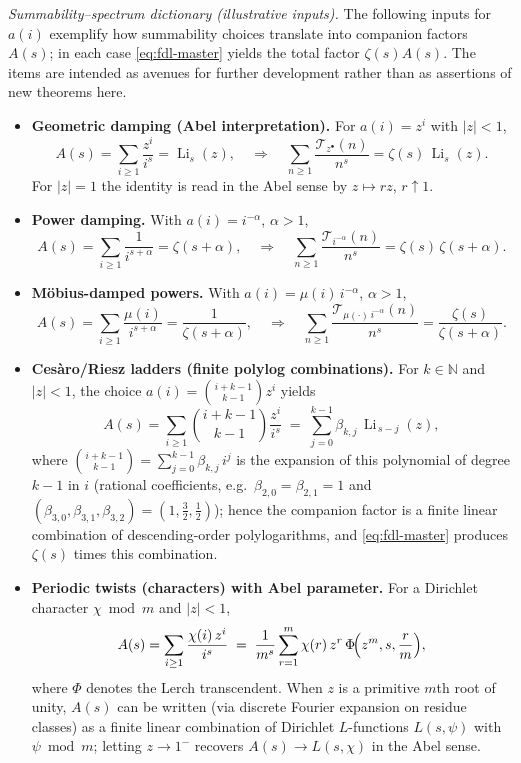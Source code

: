 \medskip
\noindent\emph{Summability--spectrum dictionary (illustrative inputs).}
The following inputs for $a(i)$ exemplify how summability choices translate into companion factors $A(s)$; in each case \eqref{eq:fdl-master} yields the total factor $\zeta(s)A(s)$. The items are intended as avenues for further development rather than as assertions of new theorems here.

\begin{itemize}
  \item[\textbf{(G)}] \textbf{Geometric damping (Abel interpretation).} For $a(i)=z^i$ with $|z|<1$,
  \[
  A(s)=\sum_{i\ge1}\frac{z^i}{i^s}=\operatorname{Li}_s(z),
  \quad\Rightarrow\quad
  \sum_{n\ge1}\frac{\mathcal T_{z^\bullet}(n)}{n^s}=\zeta(s)\,\operatorname{Li}_s(z).
  \]
  For $|z|=1$ the identity is read in the Abel sense by $z\mapsto rz$, $r\uparrow1$.
  \item[\textbf{(P)}] \textbf{Power damping.} With $a(i)=i^{-\alpha}$, $\alpha>1$,
  \[
  A(s)=\sum_{i\ge1}\frac{1}{i^{s+\alpha}}=\zeta(s+\alpha),
  \quad\Rightarrow\quad
  \sum_{n\ge1}\frac{\mathcal T_{i^{-\alpha}}(n)}{n^s}=\zeta(s)\,\zeta(s+\alpha).
  \]
  \item[\textbf{(M)}] \textbf{M\"obius-damped powers.} With $a(i)=\mu(i)\,i^{-\alpha}$, $\alpha>1$,
  \[
  A(s)=\sum_{i\ge1}\frac{\mu(i)}{i^{s+\alpha}}=\frac{1}{\zeta(s+\alpha)},
  \quad\Rightarrow\quad
  \sum_{n\ge1}\frac{\mathcal T_{\mu(\cdot)\,i^{-\alpha}}(n)}{n^s}=\frac{\zeta(s)}{\zeta(s+\alpha)}.
  \]
  \item[\textbf{(C)}] \textbf{Ces\`aro/Riesz ladders (finite polylog combinations).}
  For $k\in\mathbb N$ and $|z|<1$, the choice $a(i)=\binom{i+k-1}{k-1}z^i$ yields
  \[
  A(s)=\sum_{i\ge1}\binom{i+k-1}{k-1}\frac{z^i}{i^s}
  \;=\;\sum_{j=0}^{k-1}\beta_{k,j}\,\operatorname{Li}_{\,s-j}(z),
  \]
  where $\binom{i+k-1}{k-1}=\sum_{j=0}^{k-1}\beta_{k,j}\,i^{j}$ is the expansion of this polynomial of degree $k-1$ in $i$ (rational coefficients, e.g.\ $\beta_{2,0}=\beta_{2,1}=1$ and $(\beta_{3,0},\beta_{3,1},\beta_{3,2})=(1,\tfrac32,\tfrac12)$); hence the companion factor is a finite linear combination of descending-order polylogarithms, and \eqref{eq:fdl-master} produces $\zeta(s)$ times this combination.
  \item[\textbf{(Tw)}] \textbf{Periodic twists (characters) with Abel parameter.}
  For a Dirichlet character $\chi\bmod m$ and $|z|<1$,
  \[
  A(s)=\sum_{i\ge1}\frac{\chi(i)\,z^i}{i^s}
  \;=\;\frac{1}{m^s}\sum_{r=1}^{m}\chi(r)\,z^{r}\,\Phi\!\Bigl(z^{m},s,\frac{r}{m}\Bigr),
  \]
  where $\Phi$ denotes the Lerch transcendent. When $z$ is a primitive $m$th root of unity, $A(s)$ can be written (via discrete Fourier expansion on residue classes) as a finite linear combination of Dirichlet $L$-functions $L(s,\psi)$ with $\psi\bmod m$; letting $z\to1^{-}$ recovers $A(s)\to L(s,\chi)$ in the Abel sense.
\end{itemize}

